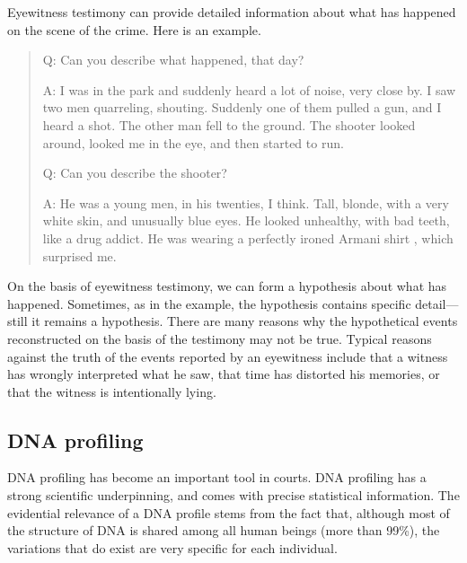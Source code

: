 \documentclass[10pt]{article}
\begin{document}
Eyewitness testimony can provide detailed information about what has happened on the scene of the crime. Here is an example.
%
\begin{quote}
Q: Can you describe what happened, that day?

A: I was in the park and suddenly heard a lot of noise, very close by. I saw two men quarreling, shouting. Suddenly one of them pulled a gun, and I heard a shot. The other man fell to the ground. The shooter looked around, looked me in the eye, and then started to run.

Q: Can you describe the shooter?

A: He was a young men, in his twenties, I think. Tall, blonde, with a very white skin, and unusually blue eyes. He looked unhealthy, with bad teeth, 
like a drug addict. He was wearing a perfectly ironed Armani shirt%
, which surprised me. %
\end{quote}
%
On the basis of eyewitness testimony, we can form a hypothesis about what has happened. Sometimes, as in the example, the hypothesis contains specific detail---still it remains a hypothesis. 
There are many reasons why the hypothetical events reconstructed on the basis of the testimony may not be true. Typical reasons against the truth of the events reported by an eyewitness include that a witness has wrongly interpreted what he saw, that time has distorted his memories, or that the witness is intentionally lying. 

\subsection{DNA profiling}

DNA profiling has become an important tool in courts. DNA profiling has a strong scientific underpinning, and comes with precise statistical information. The evidential relevance of a DNA profile stems from the fact that, although most of the structure of DNA is shared among all human beings (more than 99\%), the variations that do exist are very specific for each individual. 
\end{document}
